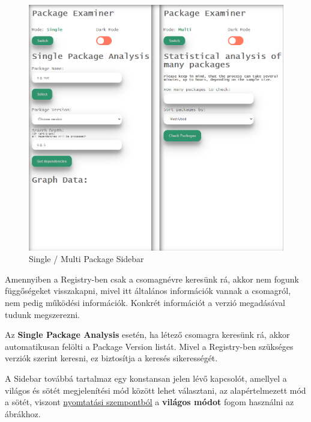 \begin{figure}[!h]
	\centering
	\includegraphics[scale=0.3]{images/ui_modes.png}
	\caption{Single / Multi Package Sidebar}
	\label{fig:ui_modes}
\end{figure}

Amennyiben a Registry-ben csak a csomagnévre keresünk rá, akkor nem fogunk függőségeket visszakapni, mivel itt általános információk vannak a csomagról, nem pedig működési információk. Konkrét információt a verzió megadásával tudunk megszerezni.

Az \textbf{Single Package Analysis} esetén, ha létező csomagra keresünk rá, akkor automatikusan felölti a Package Version listát. Mivel a Registry-ben szükséges verziók szerint keresni, ez biztosítja a keresés sikerességét.


\pagebreak

A Sidebar továbbá tartalmaz egy konstansan jelen lévő kapcsolót, amellyel a világos és sötét megjelenítési mód között lehet választani, az alapértelmezett mód a sötét, viszont \underline{nyomtatási szempontból} a \textbf{világos módot} fogom használni az ábrákhoz. 

